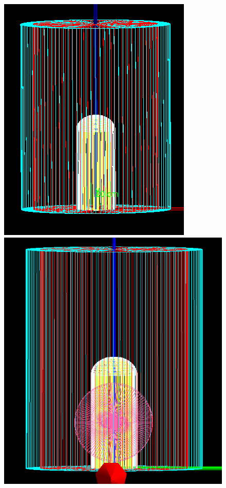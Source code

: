 \documentclass[%
12pt,
twoside,
reprint,
amsmath,amssymb,
aps,
]{article}
\begin{document}
	\begin{figure}[!htb]
		\includegraphics[width=\linewidth]{Images/original_design_cropped.png}
		\endminipage\hfill
		\includegraphics[width=\linewidth]{Images/particle_guide_detector_cropped.png}

\end{figure}
\end{document}
